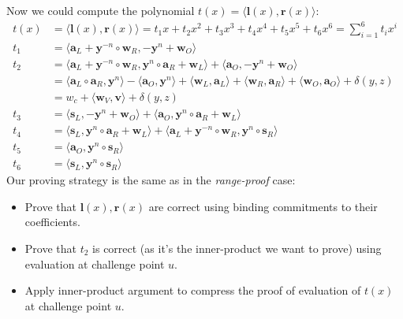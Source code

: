 \documentclass[../lecture-notes-148x210.tex]{subfiles}
\begin{document}
Now we could compute the polynomial $t(x) = \langle \mathbf{l}(x), \mathbf{r}(x) \rangle$:
\begin{equation}
    \begin{aligned}
        t(x) &= \langle \mathbf{l}(x), \mathbf{r}(x) \rangle = t_1 x + t_2 x^2 + t_3 x^3 + t_4 x^4 + t_5 x^5 + t_6 x^6 = \sum_{i=1}^{6} t_i x^i \\
        t_1 &= \langle \mathbf{a}_L + \mathbf{y}^{-n} \circ \mathbf{w}_R, - \mathbf{y}^n + \mathbf{w}_O \rangle \\
        t_2 &= \langle \mathbf{a}_L + \mathbf{y}^{-n} \circ \mathbf{w}_R, \mathbf{y}^n \circ \mathbf{a}_R + \mathbf{w}_L \rangle + \langle \mathbf{a}_O, -\mathbf{y}^n + \mathbf{w}_O \rangle  \\
        &= \langle \mathbf{a}_L \circ \mathbf{a}_R, \mathbf{y}^n \rangle - \langle \mathbf{a}_O, \mathbf{y}^n \rangle + \langle \mathbf{w}_L, \mathbf{a}_L \rangle + \langle \mathbf{w}_R, \mathbf{a}_R \rangle + \langle \mathbf{w}_O, \mathbf{a}_O \rangle + \delta(y, z) \\
        &= w_c + \langle \mathbf{w}_V, \mathbf{v} \rangle + \delta(y, z) \\
        t_3 &= \langle \mathbf{s}_L, - \mathbf{y}^n + \mathbf{w}_O \rangle + \langle \mathbf{a}_O, \mathbf{y}^n \circ \mathbf{a}_R + \mathbf{w}_L \rangle \\
        t_4 &= \langle \mathbf{s}_L, \mathbf{y}^n \circ \mathbf{a}_R +  \mathbf{w}_L \rangle + \langle \mathbf{a}_L + \mathbf{y}^{-n} \circ \mathbf{w}_R, \mathbf{y}^n \circ \mathbf{s}_R \rangle \\
        t_5 &= \langle \mathbf{a}_O, \mathbf{y}^n \circ \mathbf{s}_R \rangle \\
        t_6 &= \langle \mathbf{s}_L, \mathbf{y}^n \circ \mathbf{s}_R \rangle
    \end{aligned}
    \label{eq:inner-product-circuit-polynomials-product}
\end{equation}
Our proving strategy is the same as in the \textit{range-proof} case: 
\begin{itemize}
    \item Prove that $\mathbf{l}(x), \mathbf{r}(x)$ are correct using binding commitments to their coefficients. 
    \item Prove that $t_2$ is correct (as it's the inner-product we want to prove) using evaluation at challenge point $u$.
    \item Apply inner-product argument to compress the proof of evaluation of $t(x)$ at challenge point $u$.
\end{itemize}
\end{document}
